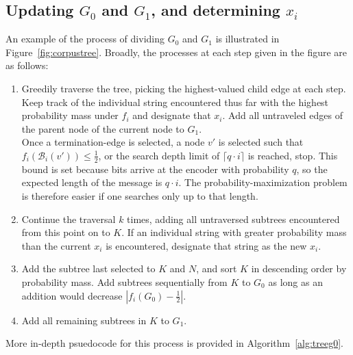 \documentclass{IEEEtran}
\begin{document}
\subsection{Updating $G_0$ and $G_1$, and determining $x_i$}
An example of the process of dividing $G_0$ and $G_1$ is illustrated
in Figure~\ref{fig:corpustree}. Broadly, the processes at each step
given in the figure are as follows:
\begin{enumerate}[label=(\alph*)]
	\item Greedily traverse the tree, picking the highest-valued child
		edge at each step. Keep track of the individual
		string encountered thus far with
		the highest probability mass under $f_i$ and designate
		that $x_i$. Add all untraveled edges of the parent node of the
		current node to $G_1$.
		\\
		Once a termination-edge is selected, a node $v'$ is selected
		such that $f_i(\mathcal{B}_i(v')) \leq \frac{1}{2}$,
		or
		the search depth limit of $\lceil q\cdot i\rceil$ is reached,
		stop. This bound is set because
		bits arrive at the encoder with probability $q$, so the
		expected length of the message is $q\cdot i$.
		The probability-maximization problem is therefore
		easier if one searches only up to
		that length.
	\item Continue the traversal $k$ times, adding all untraversed subtrees
		encountered
		from this point on to $K$. If an individual string with greater
		probability mass than the current $x_i$ is encountered, designate
		that string as the new $x_i$.
	\item Add the subtree last selected to $K$ and $N$,
		and sort $K$ in descending
		order by probability mass.
		Add subtrees sequentially
		from $K$ to $G_0$ as long as an addition would
		decrease
		$|f_i(G_0)-\frac{1}{2}|$.
	\item Add all remaining subtrees in $K$ to $G_1$.
\end{enumerate}
More in-depth psuedocode for this process is provided
in Algorithm~\ref{alg:treeg0}.
\end{document}

